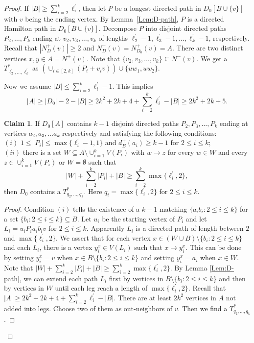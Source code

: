 \documentclass[10pt,a4paper]{article}
\theoremstyle{definition}
\newtheorem{claim}{Claim}
\begin{document}
\begin{proof}
If $|B|\geq \sum_{i=2}^k \ell^\prime_i$,  then let $P$ be a longest directed path in $D_0[B\cup\{v\}]$ with $v$ being the ending vertex. By Lemma~\ref{Lem:D-path}, $P$ is a directed Hamilton path in $D_0[B\cup\{v\}]$.  Decompose $P$ into disjoint directed paths $P_2,\ldots,P_k$ ending at $v_2,v_3,\ldots,v_k$ of lengths  $\ell^{\prime}  _2-1,\ell^{\prime}  _3-1, \ldots, \ell^{\prime}  _k -1$, respectively. Recall that $|N^+_D(v)|\geq 2$ and $N^+_D(v)=N^+_{D_0}(v)=A$. There are two distinct vertices $x,y \in A=N^+(v)$.  Note that $\{v_2,v_3,\ldots,v_k\}\subseteq N^-(v)$. We get a $T^*_{ \ell^{\prime}  _2, \ldots, \ell^{\prime}  _k}$ as $ (\cup_{i\in[2,k]}(P_i+v_iv))\cup \{uw_1, uw_2\}$.

Now we assume $|B|\leq \sum_{i=2}^k \ell^\prime_i-1$. This implies
\begin{equation}\label{bound:A}
    |A|\geq |D_0|-2-|B|\geq 2k^2+2k+4+\sum_{i=2}^k \ell^\prime_i-|B|\geq 2k^2+2k+5.
\end{equation}
\begin{claim}\label{cl:merge}
If $D_0[A]$ contains $k-1$ disjoint directed paths $P_2,P_3,\ldots,P_k$ ending at vertices $a_2,a_3,\ldots a_k$ respectively and satisfying the following conditions:  \\
$(i)$ $1\leq |P_i|\leq \max\{\ell_i^\prime-1,1\}$ and $d^+_B(a_i)\geq k-1$ for $2\leq i\leq k$;\\
$(ii)$ there is a set $W\subseteq A\setminus \cup_{i=1}^k V(P_i)$ with $w\rightarrow z$ for every $w\in W$ and every $z\in \cup_{i=1}^k V(P_i)$ or $W=\emptyset$ such that
$$
|W|+\sum_{i=2}^k|P_i|+|B|\geq \sum_{i=2}^k \max\{\ell^\prime_i,2\},
$$
then $D_0$ contains a $T^*_{ q_2, \ldots, q_k}$. Here $q_i=\max\{\ell^\prime_i,2\}$ for $2\leq i\leq k$.
\end{claim}
\begin{proof} Condition $(i)$ tells the existence of a $k-1$ matching $\{a_ib_i: 2\leq i\leq k\}$ for a set $\{b_i:2\leq i\leq k\}\subseteq B$. Let $u_i$ be the starting vertex of $P_i$ and let $L_i=u_iP_ia_ib_iv$ for $2\leq i\leq k$. Apparently $L_i$ is a directed path of length between $2$ and $\max\{\ell^\prime_i,2\}$. We assert that for each vertex $x\in (W\cup B)\setminus\{b_i: 2\leq i\leq k\}$ and each $L_i$, there is a vertex $y^x_i\in V(L_i)$ such that $x\rightarrow y^x_i$. This can be done by setting $y^x_i=v$ when $x\in B\setminus\{b_i: 2\leq i\leq k\}$ and setting $y^x_i=a_i$ when $x\in W$. Note that $|W|+\sum_{i=2}^k|P_i|+|B|\geq \sum_{i=2}^k \max\{\ell^\prime_i,2\}.$
By Lemma \ref{Lem:D-path}, we can extend each path $L_i$ first by vertices in $B\setminus\{b_i: 2\leq i\leq k\}$ and then by vertices in $W$ until each leg reach a length of $\max\{\ell^\prime_i,2\}$. Recall that $|A|\geq 2k^2+2k+4+\sum_{i=2}^k \ell^\prime_i-|B|$. There are at least $2k^2$ vertices in $A$ not added into legs. Choose two of them as out-neighbors of $v$. Then we find a $T^*_{ q_2, \ldots, q_k}$.

\end{proof}
\end{proof}
\end{document}
